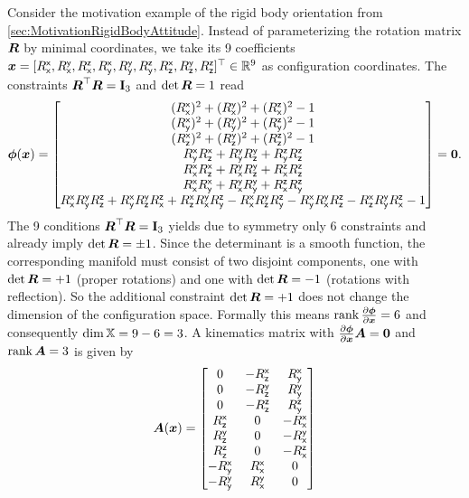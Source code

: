 \begin{Example}\label{Example:KinMatSO3}
Consider the motivation example of the rigid body orientation from \autoref{sec:MotivationRigidBodyAttitude}.
Instead of parameterizing the rotation matrix $\R$ by minimal coordinates, we take its 9 coefficients $\sysCoord = [\Rxx, \Ryx, \Rzx, \Rxy, \Ryy, \Rzy, \Rxz, \Ryz, \Rzz]^\top \in \RealNum^{9}$ as configuration coordinates.
The constraints $\R^\top \R = \idMat[3]$ and $\det\R = 1$ read
\begin{align}\label{eq:constraintSO3}
 \geoConstraint(\sysCoord) = 
  \begin{bmatrix}
  (\Rxx)^2 + (\Ryx)^2 + (\Rzx)^2 - 1 \\
  (\Rxy)^2 + (\Ryy)^2 + (\Rzy)^2 - 1 \\
  (\Rxz)^2 + (\Ryz)^2 + (\Rzz)^2 - 1 \\
  \Rxy \Rxz + \Ryy \Ryz + \Rzy \Rzz \\
  \Rxx \Rxz + \Ryx \Ryz + \Rzx \Rzz \\
  \Rxx \Rxy + \Ryx \Ryy + \Rzx \Rzy \\
  \Rxx \Ryy \Rzz + \Rxy \Ryz \Rzx + \Rxz \Ryx \Rzy - \Rxx \Ryz \Rzy - \Rxy \Ryx \Rzz - \Rxz \Ryy \Rzx - 1
 \end{bmatrix}
 = \tuple{0}.
\end{align}
The 9 conditions $\R^\top \R = \idMat[3]$ yields due to symmetry only 6 constraints and already imply $\det\R = \pm 1$.
Since the determinant is a smooth function, the corresponding manifold must consist of two disjoint components, one with $\det\R = +1$ (proper rotations) and one with $\det\R=-1$ (rotations with reflection).
So the additional constraint $\det\R = +1$ does not change the dimension of the configuration space.
Formally this means $\rank\pdiff[\geoConstraint]{\sysCoord} = 6$ and consequently $\dim\configSpace = 9-6 = 3$.
A kinematics matrix with $\pdiff[\geoConstraint]{\sysCoord} \kinMat = \mat{0}$ and $\rank\kinMat = 3$ is given by
\begin{align}\label{eq:KinMatSO3}
 \mat{A}(\sysCoord) =
 \begin{bmatrix}
  0 & -\Rxz & \Rxy \\
  0 & -\Ryz & \Ryy \\
  0 & -\Rzz & \Rzy \\
  \Rxz & 0 & -\Rxx \\
  \Ryz & 0 & -\Ryx \\
  \Rzz & 0 & -\Rzx \\
  -\Rxy & \Rxx & 0 \\
  -\Ryy & \Ryx & 0 \\

\end{bmatrix}
\end{align}
\end{Example}
